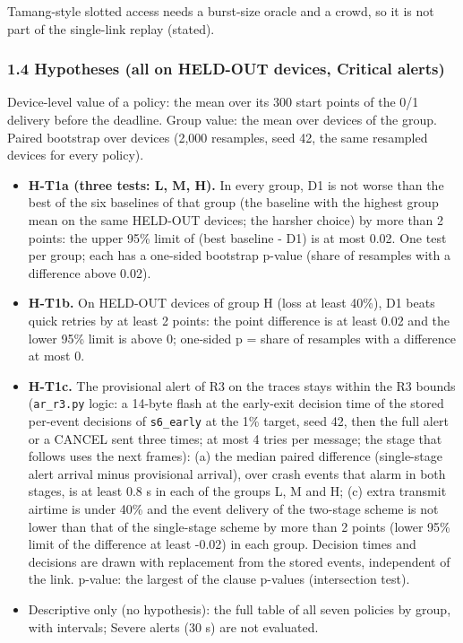 Tamang-style slotted access needs a burst-size oracle and a crowd, so it is not part of the single-link replay (stated).

\subsubsection*{1.4 Hypotheses (all on HELD-OUT devices, Critical alerts)}

Device-level value of a policy: the mean over its 300 start points of the 0/1 delivery before the deadline. Group value: the mean over devices of the group. Paired bootstrap over devices (2,000 resamples, seed 42, the same resampled devices for every policy).

\begin{itemize}
\item \textbf{H-T1a (three tests: L, M, H).} In every group, D1 is not worse than the best of the six baselines of that group (the baseline with the highest group mean on the same HELD-OUT devices; the harsher choice) by more than 2 points: the upper 95\% limit of (best baseline - D1) is at most 0.02. One test per group; each has a one-sided bootstrap p-value (share of resamples with a difference above 0.02).
\item \textbf{H-T1b.} On HELD-OUT devices of group H (loss at least 40\%), D1 beats quick retries by at least 2 points: the point difference is at least 0.02 and the lower 95\% limit is above 0; one-sided p = share of resamples with a difference at most 0.
\item \textbf{H-T1c.} The provisional alert of R3 on the traces stays within the R3 bounds (\texttt{ar\_r3.py} logic: a 14-byte flash at the early-exit decision time of the stored per-event decisions of \texttt{s6\_early} at the 1\% target, seed 42, then the full alert or a CANCEL sent three times; at most 4 tries per message; the stage that follows uses the next frames): (a) the median paired difference (single-stage alert arrival minus provisional arrival), over crash events that alarm in both stages, is at least 0.8 s in each of the groups L, M and H; (c) extra transmit airtime is under 40\% and the event delivery of the two-stage scheme is not lower than that of the single-stage scheme by more than 2 points (lower 95\% limit of the difference at least -0.02) in each group. Decision times and decisions are drawn with replacement from the stored events, independent of the link. p-value: the largest of the clause p-values (intersection test).
\item Descriptive only (no hypothesis): the full table of all seven policies by group, with intervals; Severe alerts (30 s) are not evaluated.
\end{itemize}

